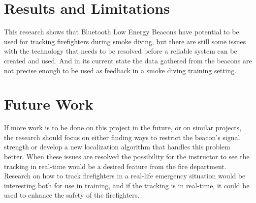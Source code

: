 \documentclass[../Main/thesis.tex]{subfiles}
\begin{document}
\section{Results and Limitations}
This research shows that Bluetooth Low Energy Beacons have potential to be used for tracking firefighters during smoke diving, but there are still some issues with the technology that needs to be resolved before a reliable system can be created and used.
And in its current state the data gathered from the beacons are not precise enough to be used as feedback in a smoke diving training setting.

\section{Future Work}
If more work is to be done on this project in the future, or on similar projects, the research should focus on either finding ways to restrict the beacon's signal strength or develop a new localization algorithm that handles this problem better.
When these issues are resolved the possibility for the instructor to see the tracking in real-time would be a desired feature from the fire department.
Research on how to track firefighters in a real-life emergency situation would be interesting both for use in training, and if the tracking is in real-time, it could be used to enhance the safety of the firefighters.
\end{document}
